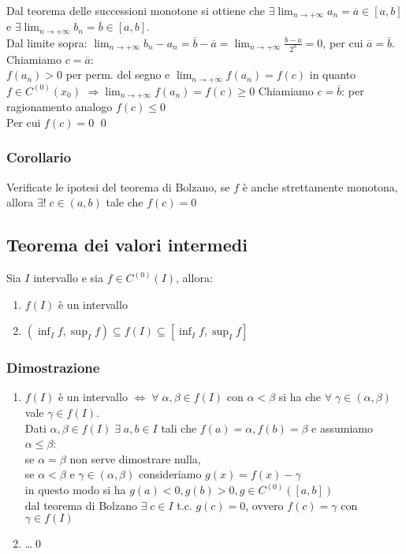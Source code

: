 \documentclass[a4paper]{article}
\newcommand\cont[2]{C^{(#1)} \left({#2}\right)}
\begin{document}
Dal teorema delle successioni monotone si ottiene che \(\displaystyle \exists \lim_{n \to +\infty} a_n = \overline{a} \in \left[a, b\right]\) e
\(\displaystyle \exists \lim_{n \to +\infty} b_n = \overline{b} \in \left[a, b\right]\).\\
Dal limite sopra: \(\displaystyle \lim_{n \to +\infty} b_n - a_n = \overline{b} - \overline{a} = \lim_{n \to +\infty} \frac{b - a}{2^n} = 0\),
per cui \(\overline{a} = \overline{b}\). \\
Chiamiamo \(c = \overline{a}\): \\
\(f(a_n) > 0\) per perm. del segno e \(\displaystyle \lim_{n \to +\infty}f(a_n) = f(c)\) in quanto \(f \in \cont{0}{x_0}\) \(\displaystyle \Rightarrow \lim_{n \to +\infty} f(a_n) = f(c) \geq 0\) 
Chiamiamo \(c = \overline{b}\): per ragionamento analogo \(f(c) \leq 0\) \\
Per cui \(f(c) = 0\) \qed

\subsubsection*{Corollario}
Verificate le ipotesi del teorema di Bolzano, se \(f\) è anche strettamente monotona, allora \(\exists! \; c \in \left(a, b\right)\) tale che \(f(c) = 0\)

\subsection{Teorema dei valori intermedi}
Sia \(I\) intervallo e sia \(f \in \cont{0}{I}\), allora:
\begin{enumerate}
	\item \(f(I)\) è un intervallo
	\item \(\displaystyle \left(\inf_I f, \sup_I f\right) \subseteq f(I) \subseteq \left[\inf_I f, \sup_I f\right]\)
\end{enumerate}

\subsubsection*{Dimostrazione}
\begin{enumerate}
	\item \(f(I)\) è un intervallo \(\Leftrightarrow \; \forall \; \alpha, \beta \in f(I)\) con \(\alpha < \beta\) si ha che \(\forall \; \gamma \in \left(\alpha, \beta\right)\) vale \(\gamma \in f(I)\). \\
	Dati \(\alpha, \beta \in f(I) \; \exists \; a, b \in I \) tali che \(f(a) = \alpha, f(b) = \beta\) e assumiamo \(\alpha \leq \beta\): \\
	se \(\alpha = \beta\) non serve dimostrare nulla, \\
	se \(\alpha < \beta\) e \(\gamma \in \left(\alpha, \beta\right)\) consideriamo \(g(x) = f(x) - \gamma\) \\
	in questo modo si ha \(g(a) < 0, g(b) > 0, g \in \cont{0}{\left[a, b\right]}\) \\
	dal teorema di Bolzano \(\exists \; c \in I\) t.c. \(g(c) = 0\), ovvero \(f(c) = \gamma\) con \(\gamma \in f(I)\)
	\item \dots \qed
\end{enumerate}
\end{document}
